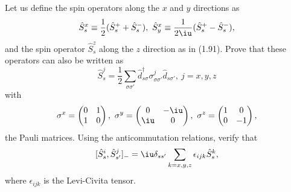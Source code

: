 \begin{problem}
  Let us define the spin operators along the $x$ and $y$ directions as
  \[
    \hat S_s^x \equiv \frac12(\hat S_s^+ + \hat S_s^-),~
    \hat S_y^x \equiv \frac1{2\iu}(\hat S_s^+ - \hat S_s^-),
  \]
  and the spin operator $\hat S_s^z$ along the $z$ direction as in (1.91).
  Prove that these operators can also be written as
  \[
    \hat S_s^j = \frac12 \sum_{\sigma\sigma'}
    \hat d_{s\sigma}^\dagger \sigma_{\sigma\sigma'}^j \hat d_{s\sigma'},~
    j = x, y, z
  \]
  with
  \[
    \sigma^x =
    \begin{pmatrix}
      0 & 1\\
      1 & 0
    \end{pmatrix},~
    \sigma^y =
    \begin{pmatrix}
      0 & -\iu\\
      \iu & 0
    \end{pmatrix},~
    \sigma^z =
    \begin{pmatrix}
      1 & 0\\
      0 & -1
    \end{pmatrix},
  \]
  the Pauli matrices. Using the anticommutation relations, verify that
  \[
    [\hat S_s^i, \hat S_{s'}^j]_- =
    \iu \delta_{ss'} \sum_{k=x,y,z} \epsilon_{ijk} \hat S_s^k,
  \]
  where $\epsilon_{ijk}$ is the Levi-Civita tensor.
\end{problem}
